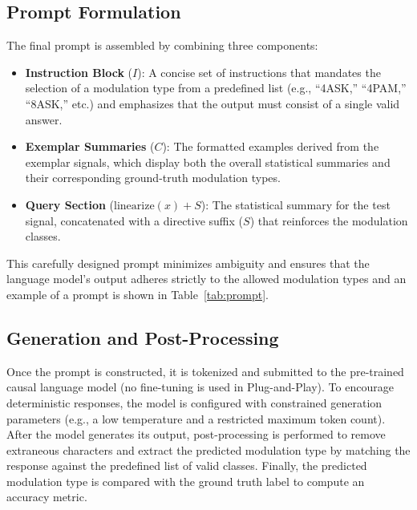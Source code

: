 \subsection{Prompt Formulation}
The final prompt is assembled by combining three components:
\begin{itemize}
    \item \textbf{Instruction Block} ($I$): A concise set of instructions that mandates the selection of a modulation type from a predefined list (e.g., ``4ASK,'' ``4PAM,'' ``8ASK,'' etc.) and emphasizes that the output must consist of a single valid answer.
    \item \textbf{Exemplar Summaries} ($C$): The formatted examples derived from the exemplar signals, which display both the overall statistical summaries and their corresponding ground-truth modulation types.
    \item \textbf{Query Section} ($\text{linearize}(x)+S$): The statistical summary for the test signal, concatenated with a directive suffix ($S$) that reinforces the modulation classes.
\end{itemize}

This carefully designed prompt minimizes ambiguity and ensures that the language model’s output adheres strictly to the allowed modulation types and an example of a prompt is shown in Table~\ref{tab:prompt}.

\subsection{Generation and Post-Processing}
Once the prompt is constructed, it is tokenized and submitted to the pre-trained causal language model (no fine-tuning is used in Plug-and-Play). To encourage deterministic responses, the model is configured with constrained generation parameters (e.g., a low temperature and a restricted maximum token count). After the model generates its output, post-processing is performed to remove extraneous characters and extract the predicted modulation type by matching the response against the predefined list of valid classes. Finally, the predicted modulation type is compared with the ground truth label to compute an accuracy metric.

